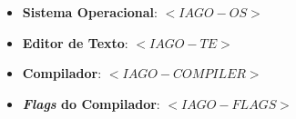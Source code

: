 \begin{itemize}
	\item{\textbf{Sistema Operacional}: $<IAGO-OS>$}
	\item{\textbf{Editor de Texto}: $<IAGO-TE>$}
	\item{\textbf{Compilador}: $<IAGO-COMPILER>$}
	\item{\textbf{\emph{Flags} do Compilador}: $<IAGO-FLAGS>$}
\end{itemize}
